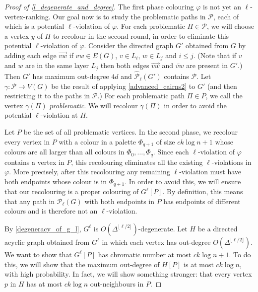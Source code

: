 \documentclass{patmorin}
\newcommand{\defin}[1]{\emph{\color{brightmaroon}#1}}
\newcommand{\pat}[1]{\textcolor{red}{PM:#1}}
\begin{document}
\begin{proof}[Proof of \cref{l_degenerate_and_degree}]
  The first phase colouring $\varphi$ is not yet an $\ell$-vertex-ranking.  Our goal now is to study the problematic paths in $\mathcal{P}$, each of which is a potential $\ell$-violation of $\varphi$.  For each problematic $\Pi\in\mathcal{P}$, we will choose a vertex $y$ of $\Pi$ to recolour in the second round, in order to eliminate this potential $\ell$-violation of $\varphi$.  Consider the directed graph $G'$ obtained from $G$ by adding each edge $\overrightarrow{vw}$ if $vw\in E(G)$, $v\in L_i$, $w\in L_j$ and $i\le j$.  (Note that if $v$ and $w$ are in the same layer $L_j$ then both edges $\overrightarrow{vw}$ and $\overleftarrow{vw}$ are present in $G'$.)  Then $G'$ has maximum out-degree $4d$ and $\widehat{\mathcal{P}}_\ell(G')$ contains $\mathcal{P}$. Let $\gamma:\mathcal{P}\to V(G)$ be the result of applying \cref{advanced_cairns2} to $G'$ (and then restricting it to the paths in $\mathcal{P}$.)  For each problematic path $\Pi\in P$, we call the vertex $\gamma(\Pi)$ \defin{problematic}.  We will recolour $\gamma(\Pi)$ in order to avoid the potential $\ell$-violation at $\Pi$.

  Let $P$ be the set of all problematic vertices.  In the second phase, we recolour every vertex in $P$ with a colour in a palette $\Phi_{q+1}$ of size $ck\log n + 1$ whose colours are all larger than all colours in $\Phi_0,\ldots,\Phi_q$.  Since each $\ell$-violation of $\varphi$ contains a vertex in $P$, this recolouring eliminates all the existing $\ell$-violations in $\varphi$.  More precisely, after this recolouring any remaining $\ell$-violation must have both endpoints whose colour is in $\Phi_{q+1}$.  In order to avoid this, we will ensure that our recolouring is a proper colouring of $G^\ell[P]$.  By definition, this means that any path in $\mathcal{P}_\ell(G)$ with both endpoints in $P$ has endpoints of different colours and is therefore not an $\ell$-violation.

  By \cref{degeneracy_of_g_l}, $G^\ell$ is $O(\Delta^{\lfloor\ell /2\rfloor})$-degenerate.  Let $H$ be a directed acyclic graph obtained from $G^{\ell}$ in which each vertex has out-degree $O(\Delta^{\lfloor\ell /2\rfloor})$. We want to show that $G^\ell[P]$ has chromatic number at most $ck\log n+1$.
  To do this, we will show that the maximum out-degree of $H[P]$ is at most $ck\log n$, with high probability.  In fact, we will show something stronger: that every vertex $p$ in $H$ has at most $ck\log n$ out-neighbours in $P$.


\end{proof}
\end{document}
